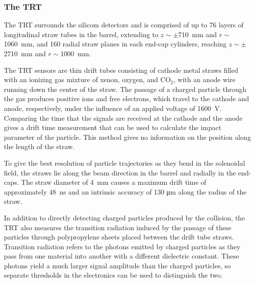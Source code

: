   
\subsubsection{The TRT}

The TRT surrounds the silicom detectors and is comprised of up to 76 layers of longitudinal straw tubes in the barrel, extending to $z\sim \pm$710~mm and $r \sim$1060~mm, and 160 radial straw planes in each end-cap cylinders, reaching $z\sim \pm$2710~mm and $r \sim$1000~mm.

 The TRT sensors are thin drift tubes consisting of cathode metal straws filled with an ionizing gas mixture of xenon, oxygen, and CO$_2$, with an anode wire running down the center of the straw. The passage of a charged particle through the gas produces positive ions and free electrons, which travel to the cathode and anode, respectively, under the influence of an applied voltage of 1600~V. Comparing the time that the signals are received at the cathode and the anode gives a drift time measurement that can be used to calculate the impact parameter of the particle. This method gives no information on the position along the length of the straw.

To give the best resolution of particle trajectories as they bend in the solenoidal field, the straws lie along the beam direction in the barrel and radially in the end-caps. The straw diameter of 4~mm causes a maximum drift time of approximately 48~ns and an intrinsic accuracy of 130 μm along the radius of the straw.

In addition to directly detecting charged particles produced by the collision, the TRT also measures the transition radiation induced by the passage of these particles through polypropylene sheets placed between the drift tube straws. Transition radiation refers to the photons emitted by charged particles as they pass from one material into another with a different dielectric constant. These photons yield a much larger signal amplitude than the charged particles, so separate thresholds in the electronics can be used to distinguish the two.

 

